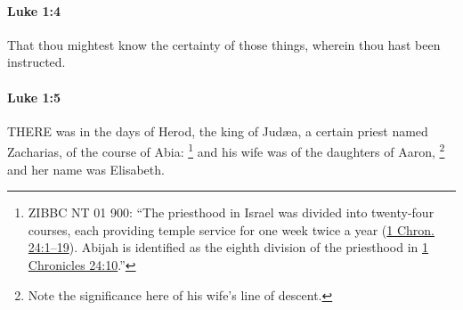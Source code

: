 		\paragraph{Luke 1:4} %
			\label{LUKE-1-4}

			That thou mightest know the certainty of those things, wherein thou hast been instructed.

			\begin{framed}
			\scriptsize
				\begin{compactdesc}
					\item[SBLG] 
				\end{compactdesc}
			\end{framed}

		\paragraph{Luke 1:5} %
			\label{LUKE-1-5}

			THERE was in the days of Herod, the king of Judæa, a certain priest named Zacharias, of the course of Abia:%
				\footnote{%
					ZIBBC NT 01 900: ``The priesthood in Israel was divided into twenty-four courses, each providing temple service for one week twice a year (\hyperref[1CHRONICLES-24-1]{1 Chron. 24:1--19}). Abijah is identified as the eighth division of the priesthood in \hyperref[1CHRONICLES-24-10]{1 Chronicles 24:10}.''
					}
			and his wife was of the daughters of Aaron,%
				\footnote{%
					Note the significance here of his wife's line of descent.
					}
			and her name was Elisabeth.

